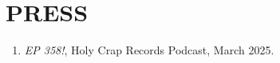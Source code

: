  \section{PRESS}
 \begin{enumerate}
    \item  \emph{EP 358!}, Holy Crap Records Podcast, March 2025. \\

\end{enumerate}
